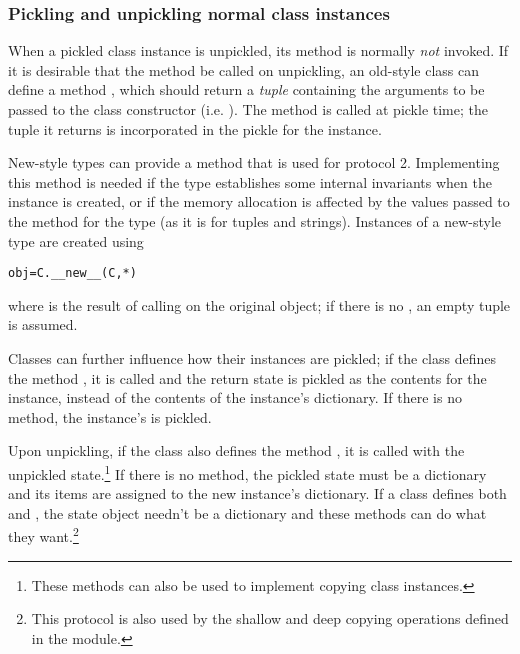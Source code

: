 \subsubsection{Pickling and unpickling normal class
    instances\label{pickle-inst}}

When a pickled class instance is unpickled, its 
method is normally \emph{not} invoked.  If it is desirable that the
 method be called on unpickling, an old-style class
can define a method , which should return a
\emph{tuple} containing the arguments to be passed to the class
constructor (i.e. ).  The
 method is called at
pickle time; the tuple it returns is incorporated in the pickle for
the instance.


New-style types can provide a  method that is
used for protocol 2.  Implementing this method is needed if the type
establishes some internal invariants when the instance is created, or
if the memory allocation is affected by the values passed to the
 method for the type (as it is for tuples and
strings).  Instances of a new-style type  are created using

\begin{alltt}
obj = C.__new__(C, *)
\end{alltt}

where  is the result of calling  on
the original object; if there is no , an
empty tuple is assumed.


Classes can further influence how their instances are pickled; if the
class defines the method , it is called and the
return state is pickled as the contents for the instance, instead of
the contents of the instance's dictionary.  If there is no
 method, the instance's  is
pickled.

Upon unpickling, if the class also defines the method
, it is called with the unpickled
state.\footnote{These methods can also be used to implement copying
class instances.}  If there is no  method, the
pickled state must be a dictionary and its items are assigned to the
new instance's dictionary.  If a class defines both
 and , the state object
needn't be a dictionary and these methods can do what they
want.\footnote{This protocol is also used by the shallow and deep
copying operations defined in the
 module.}


